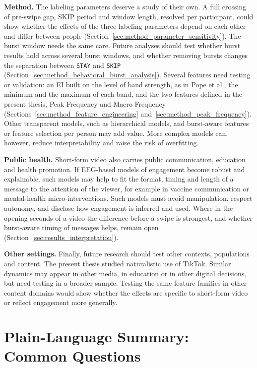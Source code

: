 \documentclass[12pt,a4paper]{report}
\begin{document}
\textbf{Method.} The labeling parameters deserve a study of their own. A full crossing of pre-swipe gap, SKIP period and window length, resolved per participant, could show whether the effects of the three labeling parameters depend on each other and differ between people (Section~\ref{sec:method_parameter_sensitivity}). The burst window needs the same care. Future analyses should test whether burst results hold across several burst windows, and whether removing bursts changes the separation between \texttt{STAY} and \texttt{SKIP} (Section~\ref{sec:method_behavioral_burst_analysis}). Several features need testing or validation: an EI built on the level of band strength, as in Pope et al., the minimum and the maximum of each band, and the two features defined in the present thesis, Peak Frequency and Macro Frequency (Sections~\ref{sec:method_feature_engineering} and~\ref{sec:method_peak_frequency}). Other transparent models, such as hierarchical models, and burst-aware features or feature selection per person may add value. More complex models can, however, reduce interpretability and raise the risk of overfitting.

\textbf{Public health.} Short-form video also carries public communication, education and health promotion. If EEG-based models of engagement become robust and explainable, such models may help to fit the format, timing and length of a message to the attention of the viewer, for example in vaccine communication or mental-health micro-interventions. Such models must avoid manipulation, respect autonomy, and disclose how engagement is inferred and used. Where in the opening seconds of a video the difference before a swipe is strongest, and whether burst-aware timing of messages helps, remain open (Section~\ref{sec:results_interpretation}).

\textbf{Other settings.} Finally, future research should test other contexts, populations and content. The present thesis studied naturalistic use of TikTok. Similar dynamics may appear in other media, in education or in other digital decisions, but need testing in a broader sample. Testing the same feature families in other content domains would show whether the effects are specific to short-form video or reflect engagement more generally.

\chapter{Plain-Language Summary: Common Questions}
\label{chap:plain_language}
\end{document}
